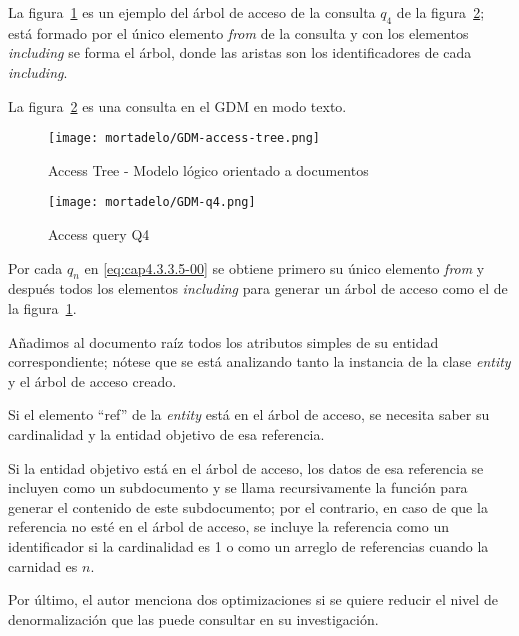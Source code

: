 La figura~\ref{img:mortadelo-gdm-logical-model-access-tree} es un ejemplo del árbol de acceso de la consulta $q_{4}$ de la figura~\ref{img:mortadelo-gdm-logical-model-q4}; está formado por el único elemento \textit{from} de la consulta y con los elementos \textit{including} se forma el árbol, donde las aristas son los identificadores de cada \textit{including}.


La figura~\ref{img:mortadelo-gdm-logical-model-q4} es una consulta en el GDM en modo texto.


\begin{figure}[H] 
    \centering
    \texttt{[image: mortadelo/GDM-access-tree.png]}
    \caption{Access Tree - Modelo lógico orientado a documentos}
    \label{img:mortadelo-gdm-logical-model-access-tree}
\end{figure}


\begin{figure}[H] 
    \centering
    \texttt{[image: mortadelo/GDM-q4.png]}
    \caption{Access query Q4}
    \label{img:mortadelo-gdm-logical-model-q4}
\end{figure}


Por cada $q_{n}$ en \eqref{eq:cap4.3.3.5-00} se obtiene primero su único elemento \textit{from} y después todos los elementos \textit{including} para generar un árbol de acceso como el de la figura~\ref{img:mortadelo-gdm-logical-model-access-tree}.


Añadimos al documento raíz todos los atributos simples de su entidad correspondiente; nótese que se está analizando tanto la instancia de la clase \textit{entity} y el árbol de acceso creado.


Si el elemento ``ref'' de la \textit{entity} está en el árbol de acceso, se necesita saber su cardinalidad y la entidad objetivo de esa referencia.


Si la entidad objetivo está en el árbol de acceso, los datos de esa referencia se incluyen como un subdocumento y se llama recursivamente la función para generar el contenido de este subdocumento; por el contrario, en caso de que la referencia no esté en el árbol de acceso, se incluye la referencia como un identificador si la cardinalidad es 1 o como un arreglo de referencias cuando la carnidad es $n$.


Por último, el autor menciona dos optimizaciones si se quiere reducir el nivel de denormalización que las puede consultar en su investigación\cite{de_la_vega_mortadelo_2020}.

